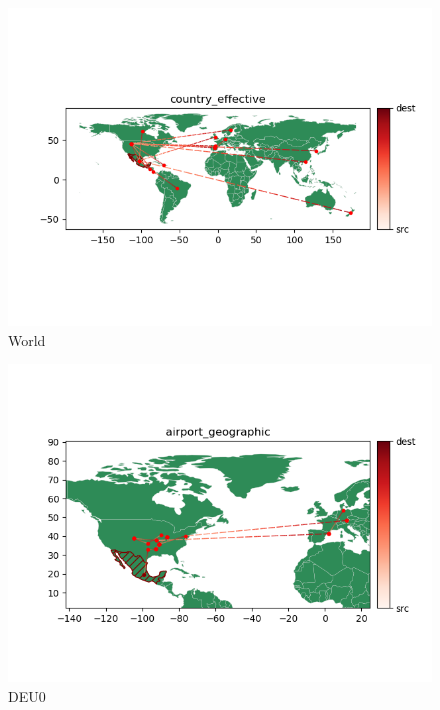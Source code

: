 \documentclass{article}
\begin{document}
\begin{figure}[!ht]
    \centering
    \includegraphics[width=0.8\linewidth]{world.png}
    \caption{World}%
    \label{fig:world}
\end{figure}

\begin{figure}[h!]
    \centering
    \includegraphics[width=0.8\linewidth]{DEU_0.png}
    \caption{DEU0}%
    \label{fig:DEU0}
\end{figure}


  
  
\end{document}
